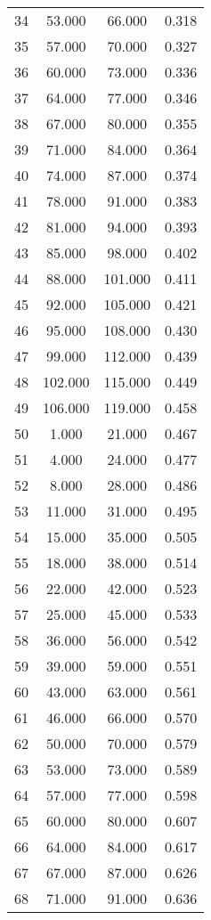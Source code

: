 \begin{tabular}{cccc}
  34 & 53.000 & 66.000 & 0.318 \\ 
  35 & 57.000 & 70.000 & 0.327 \\ 
  36 & 60.000 & 73.000 & 0.336 \\ 
  37 & 64.000 & 77.000 & 0.346 \\ 
  38 & 67.000 & 80.000 & 0.355 \\ 
  39 & 71.000 & 84.000 & 0.364 \\ 
  40 & 74.000 & 87.000 & 0.374 \\ 
  41 & 78.000 & 91.000 & 0.383 \\ 
  42 & 81.000 & 94.000 & 0.393 \\ 
  43 & 85.000 & 98.000 & 0.402 \\ 
  44 & 88.000 & 101.000 & 0.411 \\ 
  45 & 92.000 & 105.000 & 0.421 \\ 
  46 & 95.000 & 108.000 & 0.430 \\ 
  47 & 99.000 & 112.000 & 0.439 \\ 
  48 & 102.000 & 115.000 & 0.449 \\ 
  49 & 106.000 & 119.000 & 0.458 \\ 
  50 & 1.000 & 21.000 & 0.467 \\ 
  51 & 4.000 & 24.000 & 0.477 \\ 
  52 & 8.000 & 28.000 & 0.486 \\ 
  53 & 11.000 & 31.000 & 0.495 \\ 
  54 & 15.000 & 35.000 & 0.505 \\ 
  55 & 18.000 & 38.000 & 0.514 \\ 
  56 & 22.000 & 42.000 & 0.523 \\ 
  57 & 25.000 & 45.000 & 0.533 \\ 
  58 & 36.000 & 56.000 & 0.542 \\ 
  59 & 39.000 & 59.000 & 0.551 \\ 
  60 & 43.000 & 63.000 & 0.561 \\ 
  61 & 46.000 & 66.000 & 0.570 \\ 
  62 & 50.000 & 70.000 & 0.579 \\ 
  63 & 53.000 & 73.000 & 0.589 \\ 
  64 & 57.000 & 77.000 & 0.598 \\ 
  65 & 60.000 & 80.000 & 0.607 \\ 
  66 & 64.000 & 84.000 & 0.617 \\ 
  67 & 67.000 & 87.000 & 0.626 \\ 
  68 & 71.000 & 91.000 & 0.636 \\ 

\end{tabular}
